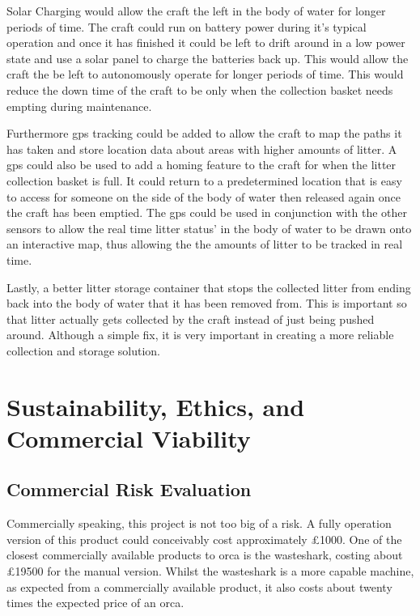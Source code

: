 \documentclass [11pt]{article}
\begin{document}
Solar Charging would allow the craft the left in the body of water for longer periods of time. The craft could run on battery power during it's typical operation and once it has finished it could be left to drift around in a low power state and use a solar panel to charge the batteries back up. This would allow the craft the be left to autonomously operate for longer periods of time. This would reduce the down time of the craft to be only when the collection basket needs empting during maintenance.

Furthermore \gls{gps} tracking could be added to allow the craft to map the paths it has taken and store location data about areas with higher amounts of litter. A \gls{gps} could also be used to add a homing feature to the craft for when the litter collection basket is full. It could return to a predetermined location that is easy to access for someone on the side of the body of water then released again once the craft has been emptied. The \gls{gps} could be used in conjunction with the other sensors to allow the real time litter status' in the body of water to be drawn onto an interactive map, thus allowing the the amounts of litter to be tracked in real time. 

Lastly, a better litter storage container that stops the collected litter from ending back into the body of water that it has been removed from. This is important so that litter actually gets collected by the craft instead of just being pushed around. Although a simple fix, it is very important in creating a more reliable collection and storage solution.  

\section{Sustainability, Ethics, and Commercial Viability}

\subsection{Commercial Risk Evaluation}
Commercially speaking, this project is not too big of a risk. A fully operation version of this product could conceivably cost approximately £1000. One of the closest commercially available products to \gls{orca} is the wasteshark, costing about £19500 for the manual version. Whilst the wasteshark is a more capable machine, as expected from a commercially available product, it also costs about twenty times the expected price of an \gls{orca}.
\end{document}
